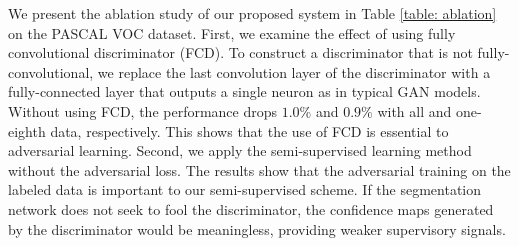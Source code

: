 \documentclass{bmvc2k}
\begin{document}
	\vspace{-3mm}{\flushleft \bf Ablation study.}
	We present the ablation study of our proposed system in Table \ref{table: ablation} on the PASCAL VOC dataset.
	First, we examine the effect of using fully convolutional discriminator (FCD).
	To construct a discriminator that is not fully-convolutional, we replace the last convolution layer of the discriminator with a fully-connected layer that outputs a single neuron as in typical GAN models.
	Without using FCD, the performance drops $1.0\%$ and $0.9\%$ with all and one-eighth data, respectively.
	This shows that the use of FCD is essential to adversarial learning.
	Second, we apply the semi-supervised learning method without the adversarial loss.
	The results show that the adversarial training on the labeled data is important to our semi-supervised scheme.
	If the segmentation network does not seek to fool the discriminator, the confidence maps generated by the discriminator would be meaningless, providing weaker supervisory signals.
	\vspace{-2mm}	
	
\end{document}
